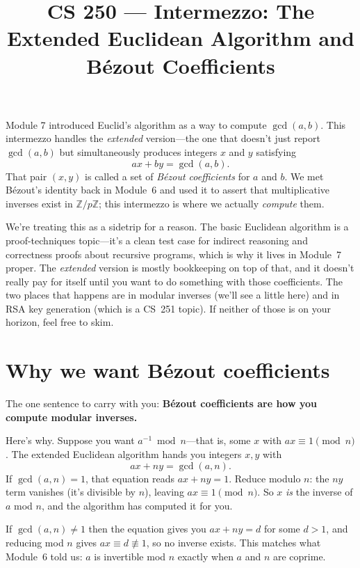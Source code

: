 \documentclass[11pt]{article}
\title{CS 250 --- Intermezzo: The Extended Euclidean Algorithm and B\'ezout Coefficients}
\author{}
\date{}
\begin{document}
\maketitle

Module 7 introduced Euclid's algorithm as a way to compute $\gcd(a,b)$. This intermezzo handles the \emph{extended} version---the one that doesn't just report $\gcd(a,b)$ but simultaneously produces integers $x$ and $y$ satisfying
\[
  a x + b y = \gcd(a,b).
\]
That pair $(x, y)$ is called a set of \emph{B\'ezout coefficients} for $a$ and $b$. We met B\'ezout's identity back in Module~6 and used it to assert that multiplicative inverses exist in $\mathbb{Z}/p\mathbb{Z}$; this intermezzo is where we actually \emph{compute} them.

We're treating this as a sidetrip for a reason. The basic Euclidean algorithm is a proof-techniques topic---it's a clean test case for indirect reasoning and correctness proofs about recursive programs, which is why it lives in Module~7 proper. The \emph{extended} version is mostly bookkeeping on top of that, and it doesn't really pay for itself until you want to do something with those coefficients. The two places that happens are in modular inverses (we'll see a little here) and in RSA key generation (which is a CS~251 topic). If neither of those is on your horizon, feel free to skim.

\section{Why we want B\'ezout coefficients}

The one sentence to carry with you: \textbf{B\'ezout coefficients are how you compute modular inverses.}

Here's why. Suppose you want $a^{-1} \bmod n$---that is, some $x$ with $a x \equiv 1 \pmod n$. The extended Euclidean algorithm hands you integers $x, y$ with
\[
  a x + n y = \gcd(a, n).
\]
If $\gcd(a, n) = 1$, that equation reads $a x + n y = 1$. Reduce modulo $n$: the $n y$ term vanishes (it's divisible by $n$), leaving $a x \equiv 1 \pmod n$. So $x$ \emph{is} the inverse of $a$ mod $n$, and the algorithm has computed it for you.

If $\gcd(a, n) \neq 1$ then the equation gives you $a x + n y = d$ for some $d > 1$, and reducing mod $n$ gives $a x \equiv d \not\equiv 1$, so no inverse exists. This matches what Module~6 told us: $a$ is invertible mod $n$ exactly when $a$ and $n$ are coprime.
\end{document}
